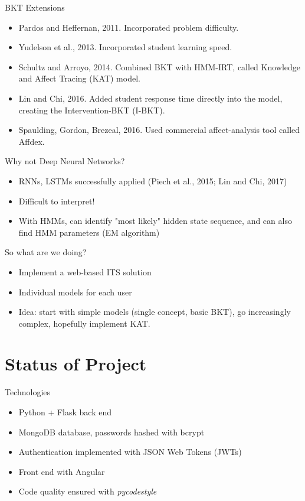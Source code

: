 \documentclass[11pt]{beamer}
\begin{document}
\begin{frame}{BKT Extensions}
	\begin{itemize}
		\item Pardos and Heffernan, 2011. Incorporated problem difficulty.
		\item Yudelson et al., 2013. Incorporated student learning speed.
		\item Schultz and Arroyo, 2014. Combined BKT with HMM-IRT, called Knowledge and Affect Tracing (KAT) model.
		\item Lin and Chi, 2016. Added student response time directly into the model, creating the Intervention-BKT (I-BKT).
		\item Spaulding, Gordon, Brezeal, 2016. Used commercial affect-analysis tool called Affdex.
	\end{itemize}
\end{frame}

\begin{frame}{Why not Deep Neural Networks?}
	\begin{itemize}
		\item<1-> RNNs, LSTMs successfully applied (Piech et al., 2015; Lin and Chi, 2017)
		\item<2-> Difficult to interpret!
		\item<3-> With HMMs, can identify "most likely" hidden state sequence, and can also find HMM parameters (EM algorithm)
	\end{itemize}
\end{frame}

\begin{frame}{So what are we doing?}
	\begin{itemize}
		\item<1-> Implement a web-based ITS solution
		\item<2-> Individual models for each user
		\item<3-> Idea: start with simple models (single concept, basic BKT), go increasingly complex, hopefully implement KAT.
	\end{itemize}
\end{frame}

\section{Status of Project}
\begin{frame}{Technologies}
	\begin{itemize}
		\item Python + Flask back end
		\item MongoDB database, passwords hashed with bcrypt
		\item Authentication implemented with JSON Web Tokens (JWTs)
		\item Front end with Angular
		\item Code quality ensured with \textit{pycodestyle}
	\end{itemize}
\end{frame}
\end{document}
